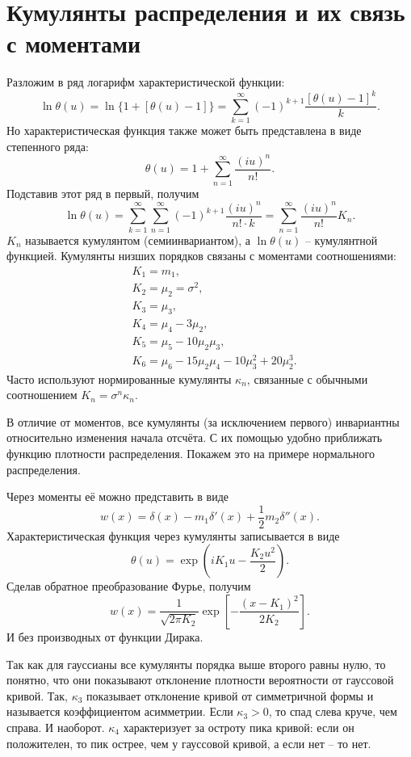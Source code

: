 \section{Кумулянты распределения и их связь с моментами}
Разложим в ряд логарифм характеристической функции:
\[
    \ln\theta(u) = \ln\{1 + [\theta(u) - 1]\} = \sum_{k=1}^\infty
    (-1)^{k+1}\frac{[\theta(u) - 1]^k}{k}.
\]
Но характеристическая функция также может быть представлена в виде степенного
ряда:
\[
    \theta(u) = 1 + \sum_{n=1}^\infty \frac{(iu)^n}{n!}.
\]
Подставив этот ряд в первый, получим
\[
    \ln\theta(u) = \sum_{k=1}^\infty \sum_{n=1}^\infty
    (-1)^{k+1}\frac{(iu)^n}{n! \cdot k} =
    \sum_{n=1}^\infty\frac{(iu)^n}{n!}K_n.
\]
\( K_n \) называется кумулянтом (семиинвариантом), а \( \ln\theta(u) \) --
кумулянтной функцией. Кумулянты низших порядков связаны с моментами
соотношениями:
\begin{align*}
    & K_1 = m_1, \\
    & K_2 = \mu_2 = \sigma^2, \\
    & K_3 = \mu_3, \\
    & K_4 = \mu_4 - 3\mu_2, \\
    & K_5 = \mu_5 - 10\mu_2\mu_3, \\
    & K_6 = \mu_6 - 15\mu_2\mu_4 - 10\mu_3^2 + 20\mu_2^3.
\end{align*}
Часто используют нормированные кумулянты \( \kappa_n \), связанные с обычными
соотношением \( K_n = \sigma^n\kappa_n \).

В отличие от моментов, все кумулянты (за исключением первого) инвариантны
относительно изменения начала отсчёта. С их помощью удобно приближать функцию
плотности распределения. Покажем это на примере нормального распределения.

Через моменты её можно представить в виде
\[
    w(x) = \delta(x) - m_1\delta'(x) + \frac{1}{2}m_2\delta''(x).
\]
Характеристическая функция через кумулянты записывается в виде
\[
    \theta(u) = \exp\left( iK_1u - \frac{K_2u^2}{2} \right).
\]
Сделав обратное преобразование Фурье, получим
\[
    w(x) = \frac{1}{\sqrt{2\pi K_2}}\exp\left[ -\frac{(x-K_1)^2}{2K_2} \right].
\]
И без производных от функции Дирака.

Так как для гауссианы все кумулянты порядка выше второго равны нулю, то понятно,
что они показывают отклонение плотности вероятности от гауссовой кривой. Так,
\( \kappa_3 \) показывает отклонение кривой от симметричной формы и называется
коэффициентом асимметрии. Если \( \kappa_3 > 0  \), то спад слева круче, чем
справа. И наоборот. \( \kappa_4 \) характеризует за остроту пика кривой: если он
положителен, то пик острее, чем у гауссовой кривой, а если нет -- то нет.


